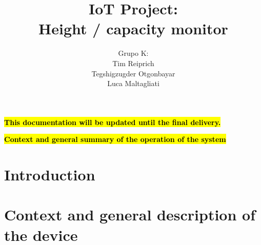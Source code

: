 \documentclass{article}
\title{IoT Project: \\Height / capacity monitor}
\author{Grupo K: \\ Tim Reiprich \\ Tegshigzugder Otgonbayar \\ Luca Maltagliati}
\begin{document}
\pagestyle{plain}

\maketitle


\newpage

\textcolor{red}{\textbf{\hl{This documentation will be updated until the final delivery.}}}

\tableofcontents %
\newpage




\textcolor{red}{\textbf{\hl{Context and general summary of the operation of the system}}}

\section{Introduction}

\section{Context and general description of the device}
\end{document}
